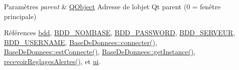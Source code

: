 \begin{DoxyParams}{Paramètres}
{\em parent} & \hyperlink{class_q_object}{Q\+Object} Adresse de l\textquotesingle{}objet Qt parent (0 = fenêtre principale) \\
\hline
\end{DoxyParams}


Références \hyperlink{class_reglages_alertes_ihm_a91b511776c98009cf8f951ec9f3e564e}{bdd}, \hyperlink{parametres_8h_a45f8f15b8f9a7ab4c2b219038ff64f6b}{B\+D\+D\+\_\+\+N\+O\+M\+B\+A\+SE}, \hyperlink{parametres_8h_ae2ded9166ed2553182545e97514c04f7}{B\+D\+D\+\_\+\+P\+A\+S\+S\+W\+O\+RD}, \hyperlink{parametres_8h_a423559dc987673b8aacaa9f369839bb0}{B\+D\+D\+\_\+\+S\+E\+R\+V\+E\+UR}, \hyperlink{parametres_8h_a88b5f5b81fa534553c68802384beff2c}{B\+D\+D\+\_\+\+U\+S\+E\+R\+N\+A\+ME}, \hyperlink{class_base_de_donnees_ac20da193923a9bfea5e38ee5a54820cd}{Base\+De\+Donnees\+::connecter()}, \hyperlink{class_base_de_donnees_a00388973f3ec42e5c8e76e7af7e124b2}{Base\+De\+Donnees\+::est\+Connecte()}, \hyperlink{class_base_de_donnees_a80028aa2b6b4fbf30fb2e36357b7d3d3}{Base\+De\+Donnees\+::get\+Instance()}, \hyperlink{class_reglages_alertes_ihm_a5c40f718b28b948a90574ef0c2d3e587}{recevoir\+Reglages\+Alertes()}, et \hyperlink{class_reglages_alertes_ihm_af3a1fcc84fb1c76248b330372947b245}{ui}.


